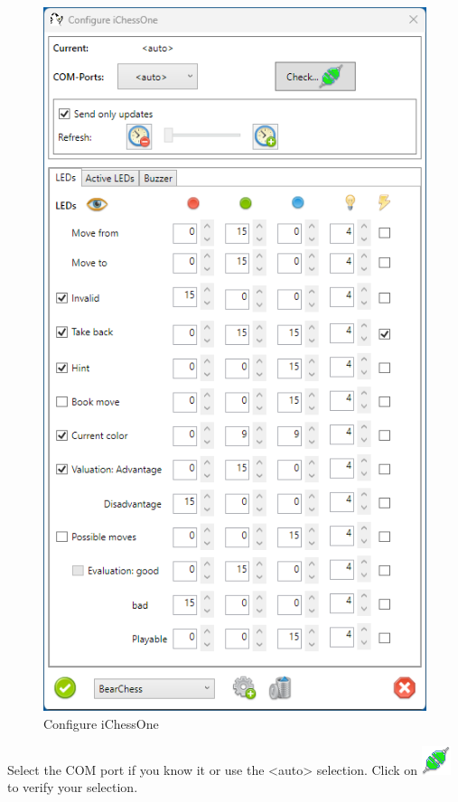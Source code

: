 \documentclass[11pt,a4paper]{article}
\begin{document}
\begin{figure}[H]
	\centering
	\includegraphics[scale=0.7]{iChessOne2.png}
	\caption{Configure iChessOne }
	\label{fig:iChessOne2}
\end{figure}


Select the COM port if you know it or use the <auto> selection.
Click on \includegraphics[scale=0.5]{connect.png} to verify your selection.
\end{document}
